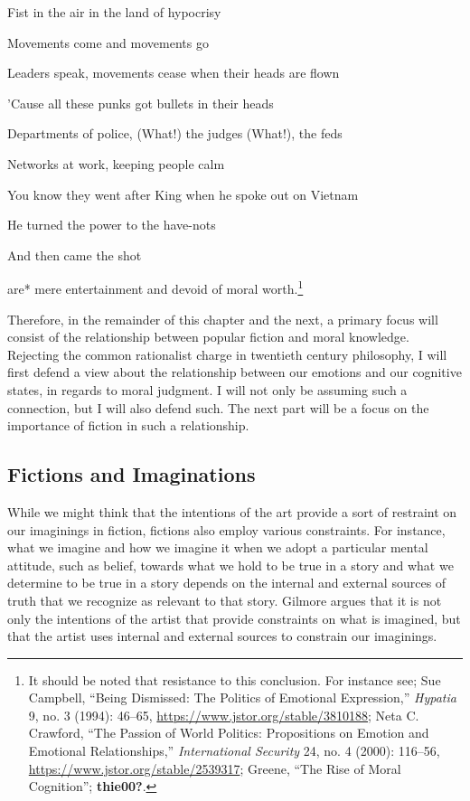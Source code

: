 \documentclass[phdthesis,12pt,final]{wuthesis}
\theoremstyle{definition}
\theoremstyle{definition}
\theoremstyle{definition}
\theoremstyle{definition}
\theoremstyle{remark}
\begin{document}
Fist in the air in the land of hypocrisy

Movements come and movements go

Leaders speak, movements cease when their heads are flown

'Cause all these punks got bullets in their heads

Departments of police, (What!) the judges (What!), the feds

Networks at work, keeping people calm

You know they went after King when he spoke out on Vietnam

He turned the power to the have-nots

And then came the shot

\noindent *are* mere entertainment and devoid of moral worth.\footnote{It should be noted that resistance to this conclusion. For instance see; Sue Campbell, {``Being {Dismissed}: {The Politics} of {Emotional Expression},''} \emph{Hypatia} 9, no. 3 (1994): 46--65, \url{https://www.jstor.org/stable/3810188}; Neta C. Crawford, {``The Passion of World Politics: Propositions on Emotion and Emotional Relationships,''} \emph{International Security} 24, no. 4 (2000): 116--56, \url{https://www.jstor.org/stable/2539317}; Greene, {``The Rise of Moral Cognition''}; \textbf{thie00?}.}

Therefore, in the remainder of this chapter and the next, a primary focus will consist of the relationship between popular fiction and moral knowledge. Rejecting the common rationalist charge in twentieth century philosophy, I will first defend a view about the relationship between our emotions and our cognitive states, in regards to moral judgment. I will not only be assuming such a connection, but I will also defend such. The next part will be a focus on the importance of fiction in such a relationship.

\subsection*{Fictions and Imaginations}\label{fictions-and-imaginations}

While we might think that the intentions of the art provide a sort of restraint on our imaginings in fiction, fictions also employ various constraints. For instance, what we imagine and how we imagine it when we adopt a particular mental attitude, such as belief, towards what we hold to be true in a story and what we determine to be true in a story depends on the internal and external sources of truth that we recognize as relevant to that story. Gilmore argues that it is not only the intentions of the artist that provide constraints on what is imagined, but that the artist uses internal and external sources to constrain our imaginings.
\end{document}
